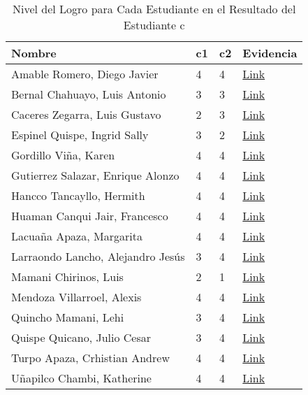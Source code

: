 \begin{landscape}
\begin{table}[h]
\centering
\begin{tabular}{L{6cm}|C{1cm}|C{1cm}|C{2cm}}
\hline
\textbf{Nombre} & 
\textbf{c1} & 
\textbf{c2} & 
\textbf{Evidencia} 
\\ \hline
Amable Romero, Diego Javier &
4 &
4 &
\href{https://drive.google.com/open?id=1a_VwNehS8UytMQLUPx3MKqE_XIXwuXfB}{Link}
\\ \hline
Bernal Chahuayo, Luis Antonio &
3 &
3 &
\href{https://drive.google.com/open?id=1a_VwNehS8UytMQLUPx3MKqE_XIXwuXfB}{Link}
\\ \hline
Caceres Zegarra, Luis Gustavo &
2 &
3 &
\href{https://drive.google.com/open?id=1a_VwNehS8UytMQLUPx3MKqE_XIXwuXfB}{Link}
\\ \hline
Espinel Quispe, Ingrid Sally &
3 &
2 &
\href{https://drive.google.com/open?id=1a_VwNehS8UytMQLUPx3MKqE_XIXwuXfB}{Link}
\\ \hline
Gordillo Viña, Karen &
4 &
4 &
\href{https://drive.google.com/open?id=1a_VwNehS8UytMQLUPx3MKqE_XIXwuXfB}{Link}
\\ \hline
Gutierrez Salazar, Enrique Alonzo &
4 &
4 &
\href{https://drive.google.com/open?id=1a_VwNehS8UytMQLUPx3MKqE_XIXwuXfB}{Link}
\\ \hline
Hancco Tancayllo, Hermith &
4 &
4 &
\href{https://drive.google.com/open?id=1a_VwNehS8UytMQLUPx3MKqE_XIXwuXfB}{Link}
\\ \hline
Huaman Canqui Jair, Francesco &
4 &
4 &
\href{https://drive.google.com/open?id=1a_VwNehS8UytMQLUPx3MKqE_XIXwuXfB}{Link}
\\ \hline
Lacuaña Apaza, Margarita &
4 &
4 &
\href{https://drive.google.com/open?id=1a_VwNehS8UytMQLUPx3MKqE_XIXwuXfB}{Link}
\\ \hline
Larraondo Lancho, Alejandro Jesús &
3 &
4 &
\href{https://drive.google.com/open?id=1a_VwNehS8UytMQLUPx3MKqE_XIXwuXfB}{Link}
\\ \hline
Mamani Chirinos, Luis &
2 &
1 &
\href{https://drive.google.com/open?id=1a_VwNehS8UytMQLUPx3MKqE_XIXwuXfB}{Link}
\\ \hline
Mendoza Villarroel, Alexis &
4 &
4 &
\href{https://drive.google.com/open?id=1a_VwNehS8UytMQLUPx3MKqE_XIXwuXfB}{Link}
\\ \hline
Quincho Mamani, Lehi &
3 &
4 &
\href{https://drive.google.com/open?id=1a_VwNehS8UytMQLUPx3MKqE_XIXwuXfB}{Link}
\\ \hline
Quispe Quicano, Julio Cesar &
3 &
4 &
\href{https://drive.google.com/open?id=1a_VwNehS8UytMQLUPx3MKqE_XIXwuXfB}{Link}
\\ \hline
Turpo Apaza, Crhistian Andrew &
4 &
4 &
\href{https://drive.google.com/open?id=1a_VwNehS8UytMQLUPx3MKqE_XIXwuXfB}{Link}
\\ \hline
Uñapilco Chambi, Katherine &
4 &
4 &
\href{https://drive.google.com/open?id=1a_VwNehS8UytMQLUPx3MKqE_XIXwuXfB}{Link}
\\ \hline
\end{tabular}
\caption{Nivel del Logro para Cada Estudiante en el Resultado del Estudiante \lbrack c\rbrack}
\label{tab:nivel_estudiante_c} 
\end{table}


\end{landscape}
